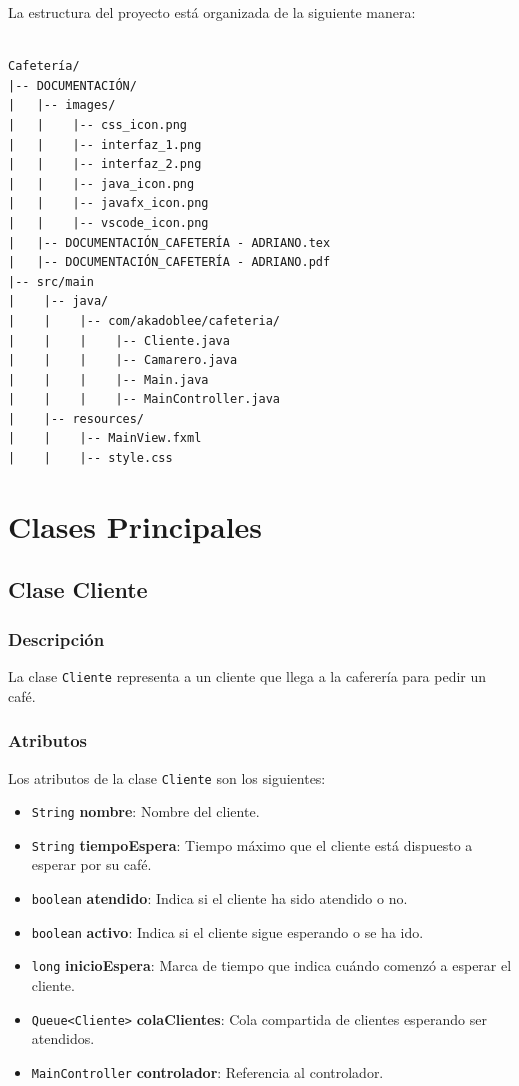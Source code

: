 \documentclass[12pt]{article}
\begin{document}
\justify
La estructura del proyecto está organizada de la siguiente manera:

\begin{verbatim}
    
Cafetería/
|-- DOCUMENTACIÓN/
|   |-- images/
|   |    |-- css_icon.png
|   |    |-- interfaz_1.png
|   |    |-- interfaz_2.png
|   |    |-- java_icon.png
|   |    |-- javafx_icon.png
|   |    |-- vscode_icon.png
|   |-- DOCUMENTACIÓN_CAFETERÍA - ADRIANO.tex
|   |-- DOCUMENTACIÓN_CAFETERÍA - ADRIANO.pdf
|-- src/main
|    |-- java/
|    |    |-- com/akadoblee/cafeteria/
|    |    |    |-- Cliente.java
|    |    |    |-- Camarero.java
|    |    |    |-- Main.java
|    |    |    |-- MainController.java
|    |-- resources/
|    |    |-- MainView.fxml
|    |    |-- style.css

\end{verbatim}

\newpage

\section{Clases Principales}

\subsection{Clase Cliente}

\subsubsection{Descripción}
La clase \texttt{Cliente} representa a un cliente que llega a la caferería para pedir un café.

\subsubsection{Atributos}
Los atributos de la clase \texttt{Cliente} son los siguientes:

\begin{itemize}

    \item \texttt{String} \textbf{nombre}: Nombre del cliente.
    \item \texttt{String} \textbf{tiempoEspera}: Tiempo máximo que el cliente está dispuesto a esperar por su café.
    \item \texttt{boolean} \textbf{atendido}: Indica si el cliente ha sido atendido o no.
    \item \texttt{boolean} \textbf{activo}: Indica si el cliente sigue esperando o se ha ido.
    \item \texttt{long} \textbf{inicioEspera}: Marca de tiempo que indica cuándo comenzó a esperar el cliente.
    \item \texttt{Queue<Cliente>} \textbf{colaClientes}: Cola compartida de clientes esperando ser atendidos.
    \item \texttt{MainController} \textbf{controlador}: Referencia al controlador.

\end{itemize}
\end{document}
